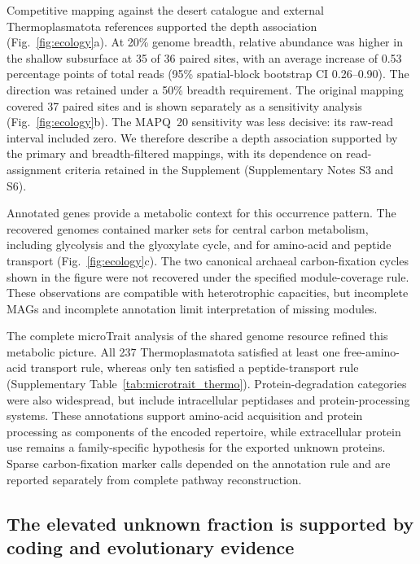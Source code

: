 \documentclass[11pt]{article}
\begin{document}
Competitive mapping against the desert catalogue and external Thermoplasmatota references supported the depth association (Fig.~\ref{fig:ecology}a). At 20\% genome breadth, relative abundance was higher in the shallow subsurface at 35 of 36 paired sites, with an average increase of 0.53 percentage points of total reads (95\% spatial-block bootstrap CI 0.26--0.90). The direction was retained under a 50\% breadth requirement. The original mapping covered 37 paired sites and is shown separately as a sensitivity analysis (Fig.~\ref{fig:ecology}b). The MAPQ~20 sensitivity was less decisive: its raw-read interval included zero. We therefore describe a depth association supported by the primary and breadth-filtered mappings, with its dependence on read-assignment criteria retained in the Supplement (Supplementary Notes S3 and S6).

Annotated genes provide a metabolic context for this occurrence pattern. The recovered genomes contained marker sets for central carbon metabolism, including glycolysis and the glyoxylate cycle, and for amino-acid and peptide transport (Fig.~\ref{fig:ecology}c). The two canonical archaeal carbon-fixation cycles shown in the figure were not recovered under the specified module-coverage rule. These observations are compatible with heterotrophic capacities, but incomplete MAGs and incomplete annotation limit interpretation of missing modules.

The complete microTrait analysis of the shared genome resource \citep{rubalkhali_datapaper,karaoz2022microtrait} refined this metabolic picture. All 237 Thermoplasmatota satisfied at least one free-amino-acid transport rule, whereas only ten satisfied a peptide-transport rule (Supplementary Table~\ref{tab:microtrait_thermo}). Protein-degradation categories were also widespread, but include intracellular peptidases and protein-processing systems. These annotations support amino-acid acquisition and protein processing as components of the encoded repertoire, while extracellular protein use remains a family-specific hypothesis for the exported unknown proteins. Sparse carbon-fixation marker calls depended on the annotation rule and are reported separately from complete pathway reconstruction.

\subsection*{The elevated unknown fraction is supported by coding and evolutionary evidence}
\end{document}
